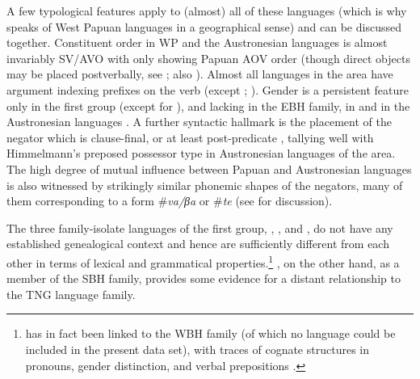 A few typological features apply to (almost) all of these languages (which is why \citealt{reesink2005west} speaks of West Papuan languages in a geographical sense) and can be discussed together. Constituent order in WP  and the Austronesian languages is almost invariably SV/AVO with only  showing Papuan AOV order (though direct objects may be placed postverbally, see \citealt[195]{reesink2005west}; also \citealt[52f.]{devries2004}). Almost all languages in the area have argument indexing prefixes on the verb (except ; \citealt[5]{dol2007grammar}). Gender is a persistent feature only in the first group (except for ), and lacking in the \textsc{EBH} family, in  and in the Austronesian languages \citep[205]{reesink2005west}. A further syntactic hallmark is the placement of the negator which is clause-final, or at least post-predicate \citep[199]{reesink2005west}, tallying well with Himmelmann's  preposed possessor type in Austronesian languages of the area. The high degree of mutual influence between Papuan and Austronesian languages is also witnessed by strikingly similar phonemic shapes of the negators, many of them corresponding to a form \#\textit{va/βa} or \#\textit{te} (see  \citealt[199]{reesink2005west} for discussion).

The three family-isolate languages of the first group, , , and , do not have any established genealogical context and hence are sufficiently different from each other in terms of lexical and grammatical properties.\footnote{ has in fact been linked to the \textsc{WBH} family (of which no language could be included in the present data set), with traces of cognate structures in pronouns, gender distinction, and verbal prepositions \citep[187]{reesink2005west}.} , on the other hand, as a member of the SBH family, provides some evidence for a distant relationship to the TNG language family. 

